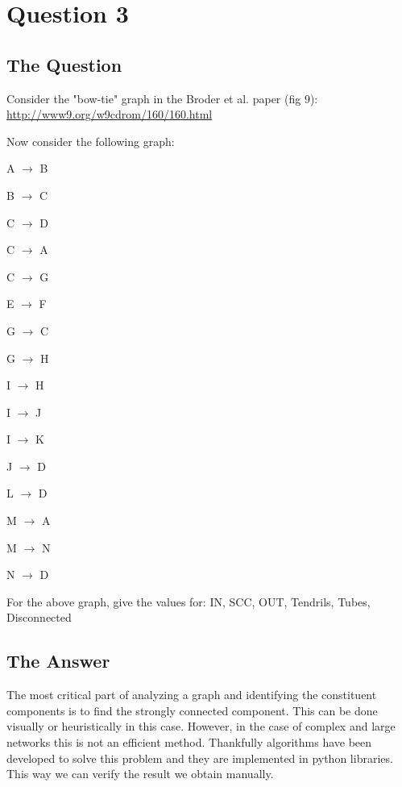 \section{Question 3}

\subsection{The Question}



 Consider the "bow-tie" graph in the Broder et al. paper (fig 9):
    \url{http://www9.org/w9cdrom/160/160.html}

    Now consider the following graph:

\begin{multicols}{4}


    A $ \rightarrow $ B

    B $ \rightarrow $ C

    C $ \rightarrow $  D

    C $ \rightarrow $ A

\columnbreak

    C $ \rightarrow $  G

    E  $ \rightarrow $  F

    G $ \rightarrow $ C

    G $ \rightarrow $ H

    I $ \rightarrow $ H

\columnbreak

    I $ \rightarrow $ J

    I $ \rightarrow $ K

    J $ \rightarrow $ D 

    L $ \rightarrow $ D

\columnbreak

    M $ \rightarrow $ A

    M $ \rightarrow $ N

    N $ \rightarrow $ D
    
\end{multicols}




    For the above graph, give the values for:  IN,   SCC,    OUT,  Tendrils,     Tubes,     Disconnected

\subsection{The Answer}


The most critical part of analyzing a graph and identifying the constituent components is to find the strongly connected component. This can be done visually or heuristically in this case. However, in the case of complex and large networks this is not an efficient method. Thankfully algorithms have been developed to solve this problem and they are implemented in python libraries. This way we can verify the result we obtain manually. 




